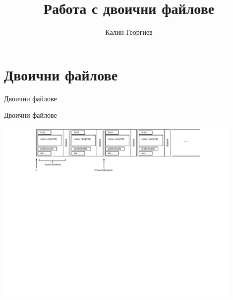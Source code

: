 \documentclass{beamer}
\begin{document}
\title[Увод в програмирането]{Работа с двоични файлове} 
\author{Калин Георгиев}
\frame{\titlepage} 


\section {Двоични файлове}

\begin{frame}
\centerline{Двоични файлове}
\end{frame}


\begin{frame}
\centerline{Двоични файлове}
\vspace{75px}
\includegraphics[width=12cm]{images/binfile}
\end{frame}
\end{document}
